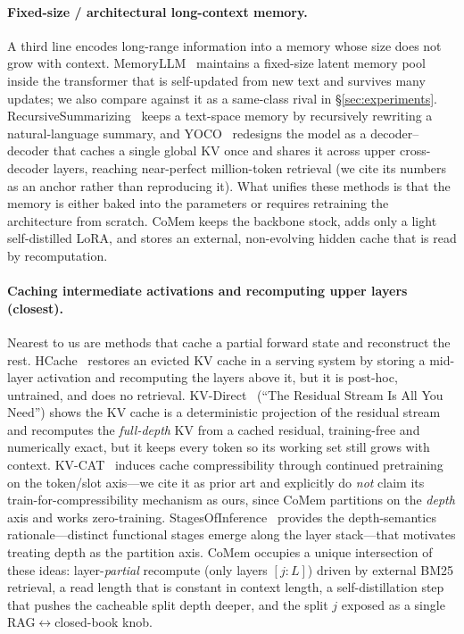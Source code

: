 \paragraph{Fixed-size / architectural long-context memory.} A third line encodes
long-range information into a memory whose size does not grow with context.
MemoryLLM~\citep{memoryllm} maintains a fixed-size latent memory pool inside the
transformer that is self-updated from new text and survives many updates; we
also compare against it as a same-class rival in \S\ref{sec:experiments}.
RecursiveSummarizing~\citep{recsum} keeps a text-space memory by recursively
rewriting a natural-language summary, and YOCO~\citep{yoco} redesigns the model
as a decoder--decoder that caches a single global KV once and shares it across
upper cross-decoder layers, reaching near-perfect million-token retrieval (we
cite its numbers as an anchor rather than reproducing it). What unifies these
methods is that the memory is either baked into the parameters or requires
retraining the architecture from scratch. CoMem keeps the backbone stock, adds
only a light self-distilled LoRA, and stores an external, non-evolving hidden
cache that is read by recomputation.

\paragraph{Caching intermediate activations and recomputing upper layers (closest).}
Nearest to us are methods that cache a partial forward state and reconstruct the
rest. HCache~\citep{hcache} restores an evicted KV cache in a serving system by
storing a mid-layer activation and recomputing the layers above it, but it is
post-hoc, untrained, and does no retrieval. KV-Direct~\citep{kvdirect}
(``The Residual Stream Is All You Need'') shows the KV cache is a deterministic
projection of the residual stream and recomputes the \emph{full-depth} KV from a
cached residual, training-free and numerically exact, but it keeps every token so
its working set still grows with context. KV-CAT~\citep{kvcat} induces cache
compressibility through continued pretraining on the token/slot axis---we cite it
as prior art and explicitly do \emph{not} claim its train-for-compressibility
mechanism as ours, since CoMem partitions on the \emph{depth} axis and works
zero-training. StagesOfInference~\citep{stagesofinference} provides the
depth-semantics rationale---distinct functional stages emerge along the layer
stack---that motivates treating depth as the partition axis. CoMem occupies a
unique intersection of these ideas: layer-\emph{partial} recompute (only
layers $[j{:}L]$) driven by external BM25 retrieval, a read length that is
constant in context length, a self-distillation step that pushes the cacheable
split depth deeper, and the split $j$ exposed as a single RAG$\leftrightarrow$closed-book
knob.
